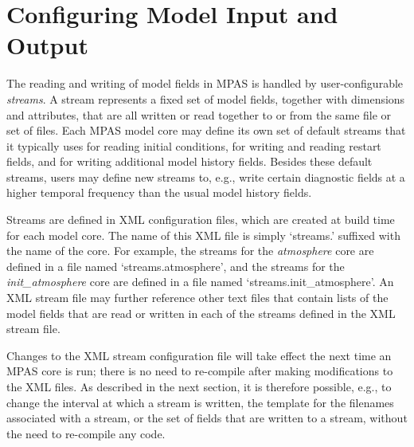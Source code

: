 \chapter{Configuring Model Input and Output}
\label{chap:mpas_io}

\newlength{\immindent}


\newlength{\mutindent}

The reading and writing of model fields in MPAS is handled by user-configurable {\em streams}. 
A stream represents a fixed set of model fields, together with dimensions and attributes, that are
all written or read together to or from the same file or set of files. Each MPAS model core may define
its own set of default streams that it typically uses for reading initial conditions, for writing and reading
restart fields, and for writing additional model history fields. Besides these default streams, users may define
new streams to, e.g., write certain diagnostic fields at a higher temporal frequency than the usual model
history fields.

Streams are defined in XML configuration files, which are created at build time for each model core. The name 
of this XML file is simply `streams.' suffixed with the name of the core. For example, the streams for 
the {\em atmosphere} core are defined in a file named `streams.atmosphere', and the streams for 
the {\em init\_atmosphere} core are defined in a file named `streams.init\_atmosphere'. An XML stream
file may further reference other text files that contain lists of the model fields that are read or written in
each of the streams defined in the XML stream file.

Changes to the XML stream configuration file will take effect the next time an MPAS core is run; there is no need
to re-compile after making modifications to the XML files. As described in the next section, it is therefore possible, e.g.,
to change the interval at which a stream is written, the template for the filenames associated with a stream, or the 
set of fields that are written to a stream, without the need to re-compile any code.


